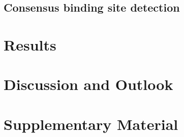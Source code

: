 \documentclass[11pt, letterpaper, titlepage]{article}
\begin{document}
\subsection{Consensus binding site detection}
\section{Results} 

\FloatBarrier

\section{Discussion and Outlook}

\section{Supplementary Material}

\pagebreak
\FloatBarrier

\renewcommand{\bibname}{References}  %
\printbibliography
\end{document}
